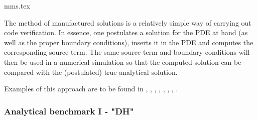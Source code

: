 \begin{flushright} {\tiny {\color{gray} mms.tex}} \end{flushright}

The method of manufactured solutions is a relatively simple way of carrying out
code verification. In essence, one postulates a solution for the PDE at hand (as
well as the proper boundary conditions), inserts it in the PDE and computes the 
corresponding source term. 
The same source term and boundary conditions will then be used in a numerical 
simulation so that the computed solution can be compared with the (postulated)
true analytical solution. 

Examples of this approach are to be found in 
\textcite{dohu03}, \textcite{busa13}, \textcite{bodg06}, \textcite{polp14},
\textcite{polp14b}, \textcite{lopp14}, \textcite{blmp16}, \textcite{thba22}.

\subsubsection{Analytical benchmark I \label{mms1} - "DH"}

